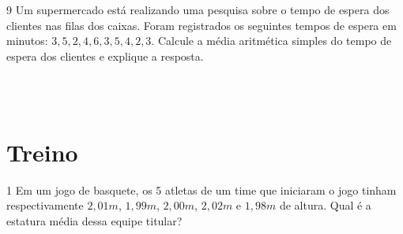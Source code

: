 \\
\\













\pagebreak

\num{9} Um supermercado está realizando uma pesquisa sobre o tempo de espera
dos clientes nas filas dos caixas. Foram registrados os seguintes tempos
de espera em minutos: $3, 5, 2, 4, 6, 3, 5, 4, 2, 3$.
Calcule a média aritmética simples do tempo de espera dos clientes e
explique a resposta.

\\
\\

\section{Treino}

\num{1} Em um jogo de basquete, os 5 atletas de um time que iniciaram o jogo
tinham respectivamente $2,01 m$, $1,99 m$, $2,00 m$, $2,02 m$ e $1,98 m$ de
altura. Qual é a estatura média dessa equipe titular?

